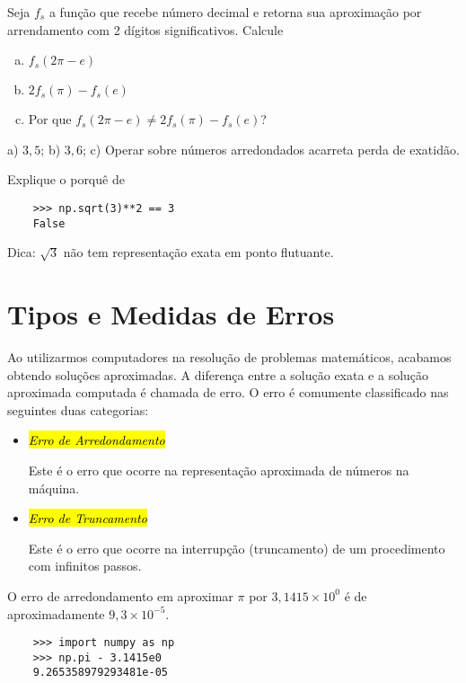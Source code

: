 \begin{exer}
  Seja $f_s$ a função que recebe número decimal e retorna sua aproximação por arrendamento com 2 dígitos significativos. Calcule
  \begin{enumerate}[a)]
  \item $f_s(2\pi - e)$
  \item $2f_s(\pi) - f_s(e)$
  \item Por que $f_s(2\pi - e) \neq  2f_s(\pi) - f_s(e)$?
  \end{enumerate}
\end{exer}
\begin{resp}
  a) $3,5$; b) $3,6$; c) Operar sobre números arredondados acarreta perda de exatidão.
\end{resp}


\begin{exer}
  Explique o porquê de
  \begin{lstlisting}
    >>> np.sqrt(3)**2 == 3
    False
  \end{lstlisting}
\end{exer}
\begin{resp}
  Dica: $\sqrt{3}$ não tem representação exata em ponto flutuante.
\end{resp}


\section{Tipos e Medidas de Erros}\label{cap_aritm_sec_erros}

Ao utilizarmos computadores na resolução de problemas matemáticos, acabamos obtendo soluções aproximadas. A diferença entre a solução exata e a solução aproximada computada é chamada de erro. O erro é comumente classificado nas seguintes duas categorias:
\begin{itemize}
\item \hl{\emph{Erro de Arredondamento}}

  Este é o erro que ocorre na representação aproximada de números na máquina.
  
\item \hl{\emph{Erro de Truncamento}}

  Este é o erro que ocorre na interrupção (truncamento) de um procedimento com infinitos passos.
\end{itemize}

\begin{ex}\label{ex:erro_de_arredondamento}
  O erro de arredondamento em aproximar $\pi$ por $3,1415\times 10^0$ é de aproximadamente $9,3\times 10^{-5}$.
  
  \begin{lstlisting}
    >>> import numpy as np
    >>> np.pi - 3.1415e0
    9.265358979293481e-05    
  \end{lstlisting}
  
\end{ex}

